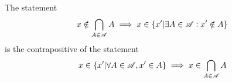 \documentclass[main.tex]{subfiles}
\begin{document}
\subproblem{}\label{6h}

\begin{remark}
	The statement
	\[x \notin \bigcap\limits_{A \in \mathscr{A}} {A} \implies x \in \{x'|\exists A \in \mathscr{A} : x' \notin A\}\]
	is the contrapositive of the statement
	\[x \in \{x'|\forall A \in \mathscr{A}, x' \in A\} \implies x \in \bigcap\limits_{A \in \mathscr{A}} {A}\]
\end{remark}
\end{document}
